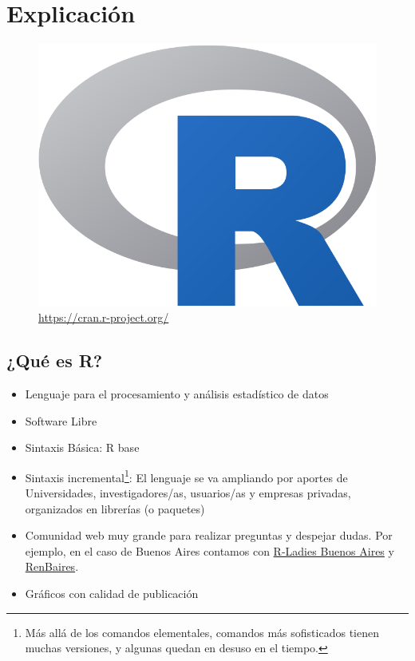 \documentclass[]{book}
\providecommand{\tightlist}{%
  \setlength{\itemsep}{0pt}\setlength{\parskip}{0pt}}
\let\rmarkdownfootnote\footnote%
\def\footnote{\protect\rmarkdownfootnote}
\begin{document}
\hypertarget{explicacion}{%
\section{Explicación}\label{explicacion}}

\begin{figure}
\centering
\includegraphics[width=10.41667in,height=\textheight]{img/Rlogo.png}
\caption{\url{https://cran.r-project.org/}}
\end{figure}

\hypertarget{que-es-r}{%
\subsection{¿Qué es R?}\label{que-es-r}}

\begin{itemize}
\tightlist
\item
  Lenguaje para el procesamiento y análisis estadístico de datos
\item
  Software Libre
\item
  Sintaxis Básica: R base
\item
  Sintaxis incremental\footnote{Más allá de los comandos elementales, comandos más sofisticados tienen muchas versiones, y algunas quedan en desuso en el tiempo.}: El lenguaje se va ampliando por aportes de Universidades, investigadores/as, usuarios/as y empresas privadas, organizados en librerías (o paquetes)
\item
  Comunidad web muy grande para realizar preguntas y despejar dudas. Por ejemplo, en el caso de Buenos Aires contamos con \href{https://www.meetup.com/es-ES/rladies-buenos-aires/}{R-Ladies Buenos Aires} y \href{https://www.meetup.com/es-ES/renbaires/}{RenBaires}.
\item
  Gráficos con calidad de publicación
\end{itemize}
\end{document}
